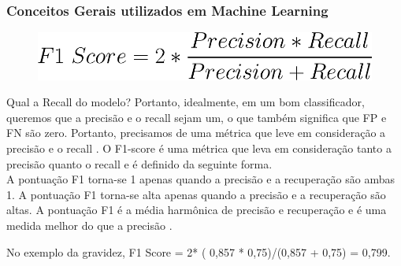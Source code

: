 \documentclass{beamer}
\begin{document}
\begin{frame}
	\frametitle{Conceitos Gerais utilizados em Machine Learning}
	\begin{figure}
		\centering
		\includegraphics[width=0.4\linewidth]{figures/f1_score}
	\end{figure}
	\begin{block}{Qual a Recall do modelo?}
		Portanto, idealmente, em um bom classificador, queremos que a precisão e o recall sejam um, o que também significa que FP e FN são zero. Portanto, precisamos de uma métrica que leve em consideração a precisão e o recall . O F1-score é uma métrica que leva em consideração tanto a precisão quanto o recall e é definido da seguinte forma. \\
		A pontuação F1 torna-se 1 apenas quando a precisão e a recuperação são ambas 1. A pontuação F1 torna-se alta apenas quando a precisão e a recuperação são altas. A pontuação F1 é a média harmônica de precisão e recuperação e é uma medida melhor do que a precisão .
		
		No exemplo da gravidez, F1 Score = 2* ( 0,857 * 0,75)/(0,857 + 0,75) = 0,799.
	\end{block}
\end{frame}
\end{document}
